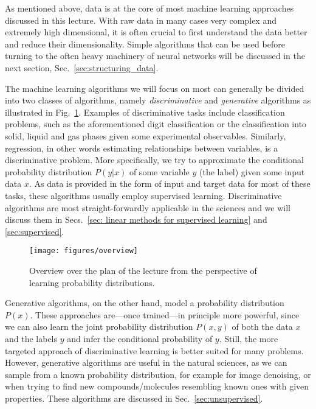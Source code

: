 
As mentioned above, data is at the core of most machine learning approaches discussed in this lecture. With raw data in many cases very complex and extremely high dimensional, it is often crucial to first understand the data better and reduce their dimensionality. Simple algorithms that can be used before turning to the often heavy machinery of neural networks will be discussed in the next section, Sec.~\ref{sec:structuring_data}.

The machine learning algorithms we will focus on most can generally be divided into two classes of algorithms, namely \emph{discriminative} and \emph{generative} algorithms as illustrated in Fig.~\ref{fig:overview}. Examples of discriminative tasks include classification problems, such as the aforementioned digit classification or the classification into solid, liquid and gas phases given some experimental observables. Similarly, regression, in other words estimating relationships between variables, is a discriminative problem. More specifically, we try to approximate the conditional probability distribution $P(y|x)$ of some variable $y$ (the label) given some input data $x$. As data is provided in the form of input and target data for most of these tasks, these algorithms usually employ supervised learning. Discriminative algorithms are most straight-forwardly applicable in the sciences and we will discuss them in Secs.~\ref{sec: linear methods for supervised learning} and \ref{sec:supervised}.

\begin{figure}
  \centering
  \texttt{[image: figures/overview]}
  \caption{Overview over the plan of the lecture from the perspective of learning probability distributions.}
  \label{fig:overview}
\end{figure}


Generative algorithms, on the other hand, model a probability distribution $P(x)$. These approaches are---once trained---in principle more powerful, since we can also learn the joint probability distribution $P(x,y)$ of both the data $x$ and the labels $y$ and infer the conditional probability of $y$. Still, the more targeted approach of discriminative learning is better suited for many problems. However, generative algorithms are useful in the natural sciences, as we can sample from a known probability distribution, for example for image denoising, or when trying to find new compounds/molecules resembling known ones with given properties. These algorithms are discussed in Sec.~\ref{sec:unsupervised}.

